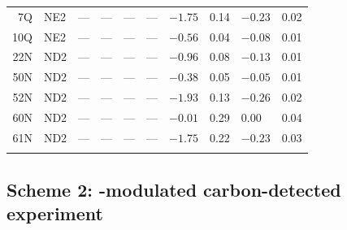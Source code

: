 \documentclass[twocolumn]{svjour3}           %
\begin{document}
\begin{table}
\begin{tabular}{|rl|ll|ll|ll|ll|}
 7Q & NE2 & ---    &---&---      & --- & $-1.75$ & 0.14 & $-0.23$  & 0.02 \\
10Q & NE2 & ---    &---&---      & --- & $-0.56$ & 0.04 & $-0.08$  & 0.01 \\
22N & ND2 & ---    &---&---      & --- & $-0.96$ & 0.08 & $-0.13$  & 0.01 \\
50N & ND2 & ---    &---&---      & --- & $-0.38$ & 0.05 & $-0.05$  & 0.01 \\
52N & ND2 & ---    &---&---      & --- & $-1.93$ & 0.13 & $-0.26$  & 0.02 \\
60N & ND2 & ---    &---&---      & --- & $-0.01$ & 0.29 & \M$0.00$ & 0.04 \\
61N & ND2 & ---    &---&---      & --- & $-1.75$ & 0.22 & $-0.23$  & 0.03 \\
\noalign{\smallskip}\hline
\end{tabular}
\label{tab:gtwo} 
\end{table}

\subsection{Scheme 2: \oneJch-modulated carbon-detected experiment}
\label{subseq:scheme2}
\end{document}

